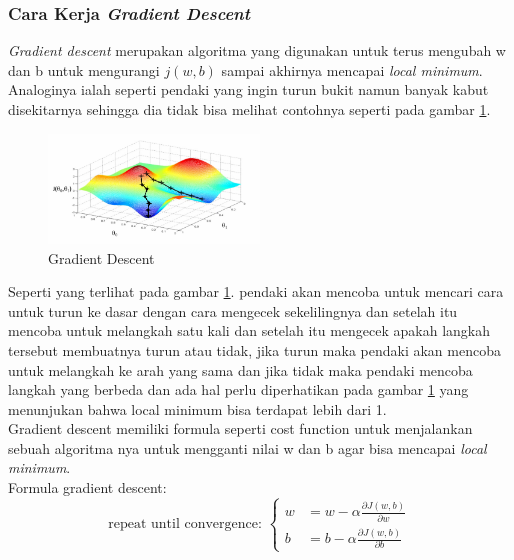 \subsubsection{Cara Kerja \textit{Gradient Descent}} \label{II.carakerjagradientdescent}
\textit{Gradient descent} merupakan algoritma yang digunakan untuk terus mengubah w dan b untuk mengurangi $j(w,b)$ sampai akhirnya mencapai \textit{local minimum}\cite{hochreiter2001learning}. Analoginya ialah seperti pendaki yang ingin turun bukit namun banyak kabut disekitarnya sehingga dia tidak bisa melihat contohnya seperti pada gambar \ref{fig:2.gradientdescent}.
\begin{figure}[H] %
    \centering
    \includegraphics[width=0.5\textwidth]{figure/gradient descent.png}
    \caption{Gradient Descent}
    \label{fig:2.gradientdescent}
\end{figure}
Seperti yang terlihat pada gambar \ref{fig:2.gradientdescent}. pendaki akan mencoba untuk mencari cara untuk turun ke dasar dengan cara mengecek sekelilingnya dan setelah itu mencoba untuk melangkah satu kali dan setelah itu mengecek apakah langkah tersebut membuatnya turun atau tidak, jika turun maka pendaki akan mencoba untuk melangkah ke arah yang sama dan jika tidak maka pendaki mencoba langkah yang berbeda dan ada hal perlu diperhatikan pada gambar \ref{fig:2.gradientdescent} yang menunjukan bahwa local minimum bisa terdapat lebih dari 1\cite{ruder2016overview}.\\
Gradient descent memiliki formula seperti cost function untuk menjalankan sebuah algoritma nya untuk mengganti nilai w dan b agar bisa mencapai \textit{local minimum}.\\
Formula gradient descent\cite{ruder2016overview}: \\
\begin{equation}
\text{repeat until convergence: } 
\left\lbrace
\begin{aligned}
  w &= w - \alpha \frac{\partial J(w,b)}{\partial w} \\
  b &= b - \alpha \frac{\partial J(w,b)}{\partial b}
\end{aligned}
\right.
\end{equation}
